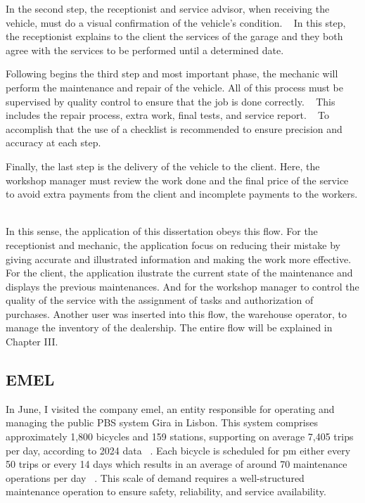 In the second step, the receptionist and service advisor, when receiving the vehicle, must do a visual confirmation of the vehicle's condition. ~\cite{Setting_the_after_sale_process}
In this step, the receptionist explains to the client the services of the garage and they both agree with the services to be performed until a determined date. ~\cite{Setting_the_after_sale_process}

Following begins the third step and most important phase, the mechanic will perform the maintenance and repair of the vehicle. 
All of this process must be supervised by quality control to ensure that the job is done correctly. ~\cite{Setting_the_after_sale_process}
This includes the repair process, extra work, final tests, and service report. ~\cite{Setting_the_after_sale_process}
To accomplish that the use of a checklist is recommended to ensure precision and accuracy at each step. ~\cite{Setting_the_after_sale_process}

Finally, the last step is the delivery of the vehicle to the client. 
Here, the workshop manager must review the work done and the final price of the service to avoid extra payments from the client and incomplete payments to the workers. ~\cite{Setting_the_after_sale_process}

In this sense, the application of this dissertation obeys this flow.
For the receptionist and mechanic, the application focus on reducing their mistake by giving accurate and illustrated information and making the work more effective.
For the client, the application ilustrate the current state of the maintenance and displays the previous maintenances.
And for the workshop manager to control the quality of the service with the assignment of tasks and authorization of purchases. 
Another user was inserted into this flow, the warehouse operator, to manage the inventory of the dealership. 
The entire flow will be explained in Chapter III. 


\subsection{EMEL}


In June, I visited the company \ac{emel}, an entity responsible for operating and managing the public \acs{PBS} system Gira in Lisbon. This system comprises approximately 1,800 bicycles and 159 stations, supporting on average 7,405 trips per day, according to 2024 data ~\cite{Gira_Trips}. Each bicycle is scheduled for \acs{pm} either every 50 trips or every 14 days which results in an average of around 70 maintenance operations per day ~\cite{Gira_Maintenance}. This scale of demand requires a well-structured maintenance operation to ensure safety, reliability, and service availability.

